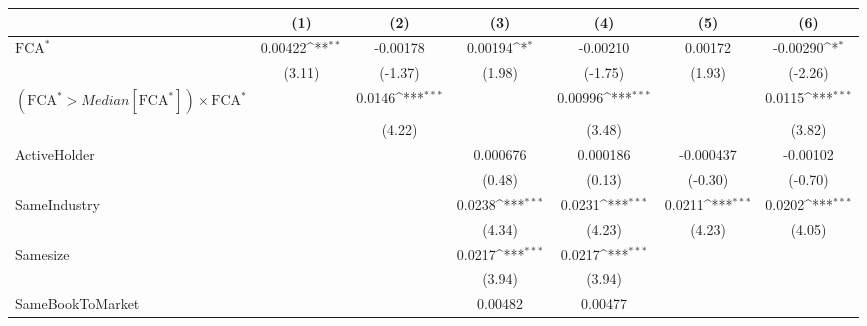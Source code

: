 {
\def\sym#1{\ifmmode^{#1}\else\(^{#1}\)\fi}
\begin{tabular}{l*{6}{c}}
\hline\hline
                    &\multicolumn{1}{c}{(1)}         &\multicolumn{1}{c}{(2)}         &\multicolumn{1}{c}{(3)}         &\multicolumn{1}{c}{(4)}         &\multicolumn{1}{c}{(5)}         &\multicolumn{1}{c}{(6)}         \\
\hline
$ \text{FCA}^* $    &     0.00422\sym{**} &    -0.00178         &     0.00194\sym{*}  &    -0.00210         &     0.00172         &    -0.00290\sym{*}  \\
                    &      (3.11)         &     (-1.37)         &      (1.98)         &     (-1.75)         &      (1.93)         &     (-2.26)         \\
[1em]
 $ (\text{FCA}^* > Median[\text{FCA}^*]) \times {\text{FCA} ^*}  $ &                     &      0.0146\sym{***}&                     &     0.00996\sym{***}&                     &      0.0115\sym{***}\\
                    &                     &      (4.22)         &                     &      (3.48)         &                     &      (3.82)         \\
[1em]
ActiveHolder        &                     &                     &    0.000676         &    0.000186         &   -0.000437         &    -0.00102         \\
                    &                     &                     &      (0.48)         &      (0.13)         &     (-0.30)         &     (-0.70)         \\
[1em]
SameIndustry        &                     &                     &      0.0238\sym{***}&      0.0231\sym{***}&      0.0211\sym{***}&      0.0202\sym{***}\\
                    &                     &                     &      (4.34)         &      (4.23)         &      (4.23)         &      (4.05)         \\
[1em]
Samesize            &                     &                     &      0.0217\sym{***}&      0.0217\sym{***}&                     &                     \\
                    &                     &                     &      (3.94)         &      (3.94)         &                     &                     \\
[1em]
SameBookToMarket    &                     &                     &     0.00482         &     0.00477         &                     &                     \\

\end{tabular}}
